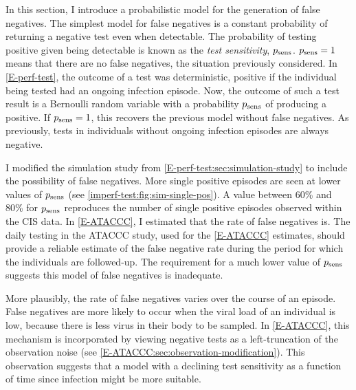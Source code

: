 \documentclass[thesis.tex]{subfiles}
\begin{document}
In this section, I introduce a probabilistic model for the generation of false negatives.
The simplest model for false negatives is a constant probability of returning a negative test even when detectable.
The probability of testing positive given being detectable is known as the \emph{test sensitivity}, $p_\text{sens}$.
$p_\text{sens} = 1$ means that there are no false negatives, the situation previously considered.
In \cref{E-perf-test}, the outcome of a test was deterministic, positive if the individual being tested had an ongoing infection episode.
Now, the outcome of such a test result is a Bernoulli random variable with a probability $p_\text{sens}$ of producing a positive.
If $p_\text{sens} = 1$, this recovers the previous model without false negatives.
As previously, tests in individuals without ongoing infection episodes are always negative.

I modified the simulation study from \cref{E-perf-test:sec:simulation-study} to include the possibility of false negatives.
More single positive episodes are seen at lower values of $p_\text{sens}$ (see \cref{imperf-test:fig:sim-single-pos}).
A value between 60\% and 80\% for $p_\text{sens}$ reproduces the number of single positive episodes observed within the CIS data.
In \cref{E-ATACCC}, I estimated that the rate of false negatives is.
The daily testing in the ATACCC study, used for the \cref{E-ATACCC} estimates, should provide a reliable estimate of the false negative rate during the period for which the individuals are followed-up.
The requirement for a much lower value of $p_\text{sens}$ suggests this model of false negatives is inadequate.

More plausibly, the rate of false negatives varies over the course of an episode.
False negatives are more likely to occur when the viral load of an individual is low, because there is less virus in their body to be sampled.
In \cref{E-ATACCC}, this mechanism is incorporated by viewing negative tests as a left-truncation of the observation noise (see \cref{E-ATACCC:sec:observation-modification}).
This observation suggests that a model with a declining test sensitivity as a function of time since infection might be more suitable.
\end{document}
